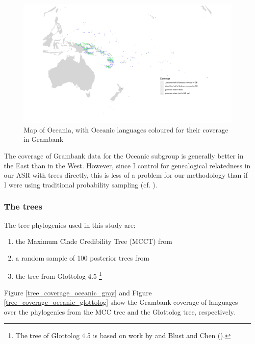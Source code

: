 \documentclass[12pt,letterpaper]{article}
\begin{document}
\begin{figure}
\centering
\includegraphics[width=\textwidth]{illustrations/plots_from_R/coverage_plots/maps/coverage_map_oceanic.png}
\caption{Map of Oceania, with Oceanic languages coloured for their coverage in Grambank}
\label{GB_austro_coverage}
\end{figure} %

The coverage of Grambank data for the Oceanic subgroup is generally better in the East than in the West. However, since I control for genealogical relatedness in our ASR with trees directly, this is less of a problem for our methodology than if I were using traditional probability sampling (cf. \citealt{ross2004morphosyntactic}).

\FloatBarrier
\subsubsection{The trees}
\label{the_trees}
The tree phylogenies used in this study are: 

\begin{enumerate}[label=(\alph*)]
    \item the Maximum Clade Credibility Tree (MCCT) from \citet{grayetal_2009}
    \item a random sample of 100 posterior trees from \citet{grayetal_2009} 
    \item the tree from Glottolog 4.5 \citep{glottolog4_5}\footnote{The tree of Glottolog 4.5 \citep{glottolog4_5} is based on work by \citet{blust_2009, blust_2014} and Blust and Chen (\citeyear{blust_chen_2017}).}
\end{enumerate}

Figure \ref{tree_coverage_oceanic_gray} and Figure \ref{tree_coverage_oceanic_glottolog} show the Grambank coverage of languages over the phylogenies from the \citet{grayetal_2009} MCC tree and the Glottolog tree, respectively. 
\end{document}
